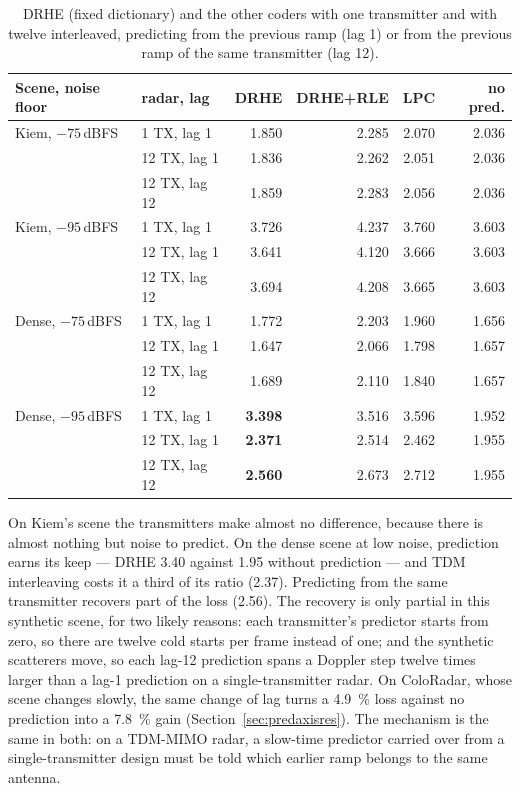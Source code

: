 \begin{table}[htbp]
\centering
\caption[One against twelve transmitters]{DRHE (fixed dictionary) and the other
coders with one transmitter and with twelve interleaved, predicting from the
previous ramp (lag 1) or from the previous ramp of the same transmitter
(lag 12).}
\label{tab:kr_tdm}
\small
\begin{tabular}{@{}llrrrr@{}}
\toprule
Scene, noise floor & radar, lag & DRHE & DRHE+RLE & LPC & no pred.\\
\midrule
Kiem, $-75$\,dBFS  & 1 TX, lag 1   & 1.850 & 2.285 & 2.070 & 2.036\\
                   & 12 TX, lag 1  & 1.836 & 2.262 & 2.051 & 2.036\\
                   & 12 TX, lag 12 & 1.859 & 2.283 & 2.056 & 2.036\\
\midrule
Kiem, $-95$\,dBFS  & 1 TX, lag 1   & 3.726 & 4.237 & 3.760 & 3.603\\
                   & 12 TX, lag 1  & 3.641 & 4.120 & 3.666 & 3.603\\
                   & 12 TX, lag 12 & 3.694 & 4.208 & 3.665 & 3.603\\
\midrule
Dense, $-75$\,dBFS & 1 TX, lag 1   & 1.772 & 2.203 & 1.960 & 1.656\\
                   & 12 TX, lag 1  & 1.647 & 2.066 & 1.798 & 1.657\\
                   & 12 TX, lag 12 & 1.689 & 2.110 & 1.840 & 1.657\\
\midrule
Dense, $-95$\,dBFS & 1 TX, lag 1   & \textbf{3.398} & 3.516 & 3.596 & 1.952\\
                   & 12 TX, lag 1  & \textbf{2.371} & 2.514 & 2.462 & 1.955\\
                   & 12 TX, lag 12 & \textbf{2.560} & 2.673 & 2.712 & 1.955\\
\bottomrule
\end{tabular}
\end{table}

\noindent
On Kiem's scene the transmitters make almost no difference, because there is
almost nothing but noise to predict. On the dense scene at low noise, prediction
earns its keep --- DRHE 3.40 against 1.95 without prediction --- and TDM
interleaving costs it a third of its ratio (2.37). Predicting from the same
transmitter recovers part of the loss (2.56). The recovery is only partial in
this synthetic scene, for two likely reasons: each transmitter's predictor
starts from zero, so there are twelve cold starts per frame instead of one; and
the synthetic scatterers move, so each lag-12 prediction spans a Doppler step
twelve times larger than a lag-1 prediction on a single-transmitter radar. On
ColoRadar, whose scene changes slowly, the same change of lag turns a
\SI{4.9}{\percent} loss against no prediction into a \SI{7.8}{\percent} gain
(Section~\ref{sec:predaxisres}). The mechanism is the same in both: on a
TDM-MIMO radar, a slow-time predictor carried over from a single-transmitter
design must be told which earlier ramp belongs to the same antenna.

